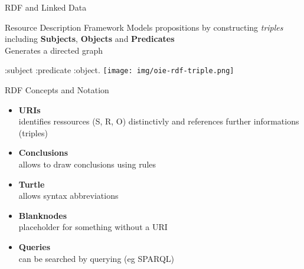 \documentclass[11pt]{beamer}
\begin{document}
		\begin{frame}{RDF and Linked Data}
			\begin{block}{Resource Description Framework}
				Models propositions by constructing \textit{triples} including \textbf{Subjects}, \textbf{Objects} and \textbf{Predicates}\\
				Generates a directed graph
			\end{block}
			\vspace{10pt}
			\begin{center}
				:subject :predicate :object.
				\vspace{10pt}
				\texttt{[image: img/oie-rdf-triple.png]}
			\end{center}
		\end{frame}
		
		\begin{frame}{RDF Concepts and Notation}
			\begin{itemize}
				\item \textbf{URIs}\\
					identifies ressources (S, R, O) distinctivly and references further informations (triples)
				\item \textbf{Conclusions}\\
					allows to draw conclusions using rules
				\item \textbf{Turtle}\\
					allows syntax abbreviations
				\item \textbf{Blanknodes}\\
					placeholder for something without a URI
				\item \textbf{Queries}\\
					can be searched by querying (eg SPARQL)
				
			\end{itemize}
		\end{frame}
		
\end{document}
